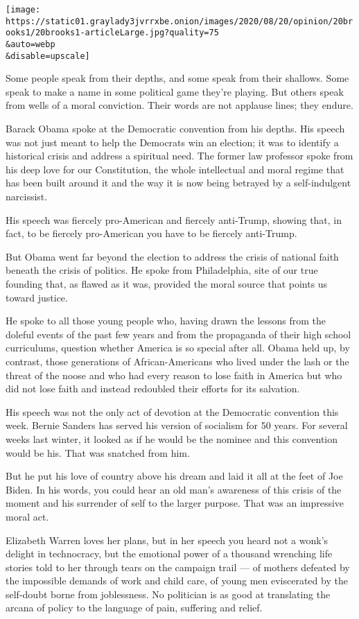 \texttt{[image: https://static01.graylady3jvrrxbe.onion/images/2020/08/20/opinion/20brooks1/20brooks1-articleLarge.jpg?quality=75\\\&auto=webp\\\&disable=upscale]}

Some people speak from their depths, and some speak from their shallows.
Some speak to make a name in some political game they're playing. But
others speak from wells of a moral conviction. Their words are not
applause lines; they endure.

Barack Obama spoke at the Democratic convention from his depths. His
speech was not just meant to help the Democrats win an election; it was
to identify a historical crisis and address a spiritual need. The former
law professor spoke from his deep love for our Constitution, the whole
intellectual and moral regime that has been built around it and the way
it is now being betrayed by a self-indulgent narcissist.

His speech was fiercely pro-American and fiercely anti-Trump, showing
that, in fact, to be fiercely pro-American you have to be fiercely
anti-Trump.

But Obama went far beyond the election to address the crisis of national
faith beneath the crisis of politics. He spoke from Philadelphia, site
of our true founding that, as flawed as it was, provided the moral
source that points us toward justice.

He spoke to all those young people who, having drawn the lessons from
the doleful events of the past few years and from the propaganda of
their high school curriculums, question whether America is so special
after all. Obama held up, by contrast, those generations of
African-Americans who lived under the lash or the threat of the noose
and who had every reason to lose faith in America but who did not lose
faith and instead redoubled their efforts for its salvation.

His speech was not the only act of devotion at the Democratic convention
this week. Bernie Sanders has served his version of socialism for 50
years. For several weeks last winter, it looked as if he would be the
nominee and this convention would be his. That was snatched from him.

But he put his love of country above his dream and laid it all at the
feet of Joe Biden. In his words, you could hear an old man's awareness
of this crisis of the moment and his surrender of self to the larger
purpose. That was an impressive moral act.

Elizabeth Warren loves her plans, but in her speech you heard not a
wonk's delight in technocracy, but the emotional power of a thousand
wrenching life stories told to her through tears on the campaign trail
--- of mothers defeated by the impossible demands of work and child
care, of young men eviscerated by the self-doubt borne from joblessness.
No politician is as good at translating the arcana of policy to the
language of pain, suffering and relief.


